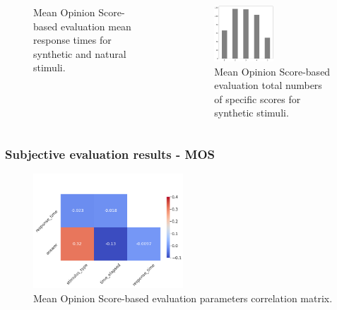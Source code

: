 \documentclass[a4paper,9pt]{beamer}
\theoremstyle{mytheoremstyle}
\begin{document}
\begin{frame}
\begin{columns}
\begin{figure}
\begin{center}
\end{center}
	\caption{Mean Opinion Score-based evaluation mean response times for synthetic and natural stimuli.}
\end{figure}
\begin{figure}
\begin{center}
\includegraphics[width=0.5\textwidth]{res/MOS_number_of_scores_synthetic_stimuli}
\end{center}
\caption{Mean Opinion Score-based evaluation total numbers of specific scores for synthetic stimuli.}
\end{figure}
\end{columns}
\end{frame}

\begin{frame}
\frametitle{Subjective evaluation results - MOS}
\begin{figure}
\begin{center}
\includegraphics[width=0.5\textwidth]{res/MOS_correlation_matrix}
\end{center}
\caption{Mean Opinion Score-based evaluation parameters correlation matrix.}
\end{figure}
\end{frame}
\end{document}
